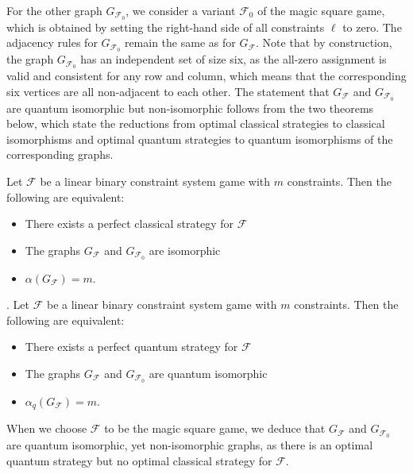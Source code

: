 For the other graph $G_{\mathcal{F}_0}$, we consider a variant $\mathcal{F}_0$ of the magic square game,
which is obtained by setting 
the right-hand side of all constraints $\ell$ to zero. 
The adjacency rules for $G_{\mathcal{F}_0}$ remain the same as for $G_\mathcal{F}$.
%
Note that by construction, the graph $G_{\mathcal{F}_0}$ has an independent set of size six,
as the all-zero assignment is valid and consistent for any row and column,
which means that the corresponding six vertices are all non-adjacent to each other.
%
The statement that $G_\mathcal{F}$ and $G_{\mathcal{F}_0}$ are quantum isomorphic
but non-isomorphic follows from the two theorems below, which state 
the reductions from optimal classical strategies to classical isomorphisms
and optimal quantum strategies to quantum isomorphisms of the corresponding graphs.
\begin{theorem}
    Let $\mathcal{F}$ be a linear binary constraint system game with $m$ constraints.
    Then the following are equivalent:
    \begin{itemize}
        \item There exists a perfect classical strategy for $\mathcal{F}$ 
        \item The graphs $G_\mathcal{F}$ and $G_{\mathcal{F}_0}$ are isomorphic
        \item $\alpha(G_\mathcal{F}) = m$.
    \end{itemize}
\end{theorem}
%
\begin{theorem}.
    Let $\mathcal{F}$ be a linear binary constraint system game with $m$ constraints.
    Then the following are equivalent:
    \begin{itemize}
        \item There exists a perfect quantum strategy for $\mathcal{F}$
        \item The graphs $G_\mathcal{F}$ and $G_{\mathcal{F}_0}$ are quantum isomorphic
        \item $\alpha_q(G_\mathcal{F}) = m$.
    \end{itemize}
\end{theorem}
When we choose $\mathcal{F}$ to be the magic square game,
we deduce that $G_\mathcal{F}$ and $G_{\mathcal{F}_0}$
are quantum isomorphic, yet non-isomorphic graphs, as there is an optimal quantum strategy but no 
optimal classical strategy for $\mathcal{F}$.



